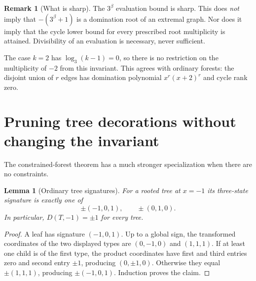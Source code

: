 \documentclass[11pt]{article}
\numberwithin{equation}{section}
\newtheorem{lemma}[theorem]{Lemma}
\theoremstyle{definition}
\newtheorem{remark}[theorem]{Remark}
\begin{document}
\begin{remark}[What is sharp]
The $3^\beta$ evaluation bound is sharp. This does \emph{not} imply that
$-(3^\beta+1)$ is a domination root of an extremal graph. Nor does it imply
that the cycle lower bound for every prescribed root multiplicity is
attained. Divisibility of an evaluation is necessary, never sufficient.
\end{remark}

The case $k=2$ has $\log_3(k-1)=0$, so there is no restriction on the
multiplicity of $-2$ from this invariant. This agrees with ordinary
forests: the disjoint union of $r$ edges has domination polynomial
$x^r(x+2)^r$ and cycle rank zero.

\section{Pruning tree decorations without changing the invariant}\label{cb:sec:pruning}

The constrained-forest theorem has a much stronger specialization when
there are no constraints.

\begin{lemma}[Ordinary tree signatures]\label{cb:lem:ordinary}
For a rooted tree at $x=-1$ its three-state signature is exactly one of
\begin{equation}\label{cb:eq:ordinary}
 \pm(-1,0,1),\qquad \pm(0,1,0).
\end{equation}
In particular, $D(T,-1)=\pm1$ for every tree.
\end{lemma}
\begin{proof}
A leaf has signature $(-1,0,1)$. Up to a global sign, the transformed
coordinates of the two displayed types are $(0,-1,0)$ and $(1,1,1)$.
If at least one child is of the first type, the product coordinates have
first and third entries zero and second entry $\pm1$, producing
$(0,\pm1,0)$. Otherwise they equal $\pm(1,1,1)$, producing
$\pm(-1,0,1)$. Induction proves the claim.
\end{proof}
\end{document}
